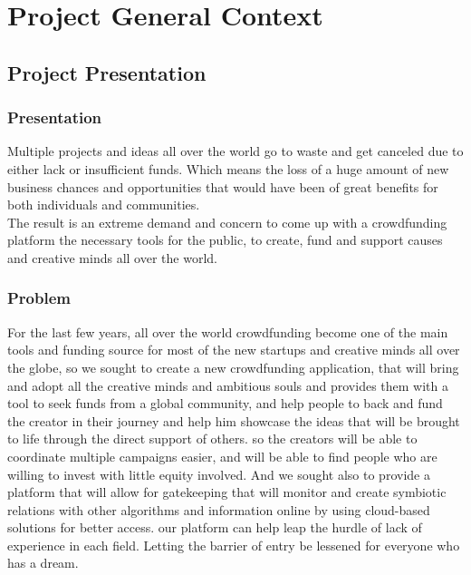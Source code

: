 

\setcounter{mtc}{7}
\chapter{Project General Context }%
\label{chap:chapter_one}
\minitoc
\section{ Project Presentation }
\subsection{Presentation}
Multiple projects and ideas all over the world go to waste and get canceled due to either lack or
insufficient funds.
Which means the loss of a huge amount of new business chances and opportunities that would have been of great benefits for both individuals and communities.\\
The result is an extreme demand and concern to come up with a crowdfunding platform the necessary tools for the public, to create, fund and support causes and creative minds all over the world.



\subsection{Problem}
For the last few years, all over the world crowdfunding become one of the main tools and funding source for most of the new startups and creative minds all over the globe,
so we sought to create a new crowdfunding application, that will bring and adopt all the creative minds and ambitious souls and provides them with a tool to seek funds from a global community,
and help people to back and fund the creator in their journey and help him showcase the ideas that will be brought to life through the direct support of others.
so the creators will be able to coordinate multiple campaigns easier, and will be able to find people who are willing to invest with little equity involved.
And we sought also to provide a platform that will allow for gatekeeping that will monitor and create symbiotic relations with other algorithms and information online by using cloud-based solutions for better access.
our platform can help leap the hurdle of lack of experience in each field. Letting the barrier of entry be lessened for everyone who has a dream.
